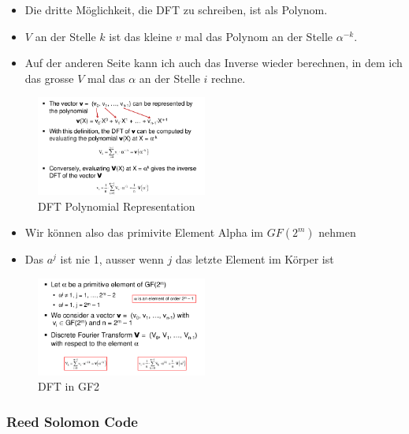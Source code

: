 \begin{itemize}
\tightlist
\item
  Die dritte Möglichkeit, die DFT zu schreiben, ist als Polynom.
\item
  $V$ an der Stelle $k$ ist das kleine $v$ mal das Polynom an der Stelle $\alpha ^{-k}$.
\item
  Auf der anderen Seite kann ich auch das Inverse wieder berechnen, in
  dem ich das grosse $V$ mal das $\alpha$ an der Stelle $i$ rechne.
\end{itemize}

\begin{figure}[H]
\centering
\includegraphics[width=0.5\textwidth]{figures/dftPolynomial.png}
\caption{DFT Polynomial Representation}
\end{figure}

\begin{itemize}
\tightlist
\item
  Wir können also das primivite Element Alpha im $GF(2^m)$ nehmen
\item
  Das $a^j$ ist nie 1, ausser wenn $j$ das letzte Element im Körper ist
\end{itemize}

\begin{figure}[H]
\centering
\includegraphics[width=0.5\textwidth]{figures/dftInGf2.png}
\caption{DFT in GF2}
\end{figure}

\hypertarget{reed-solomon-code}{%
\subsubsection{Reed Solomon Code}\label{reed-solomon-code}}

